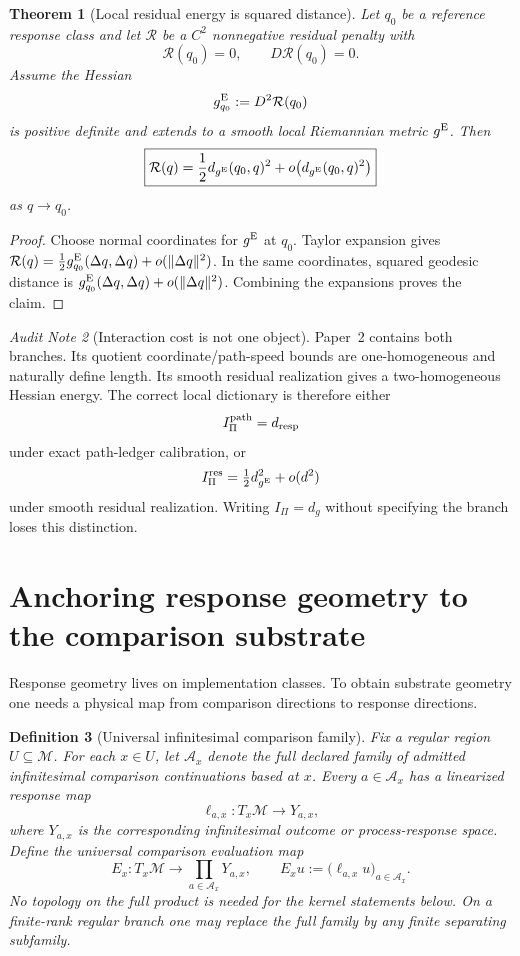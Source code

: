 \documentclass[11pt]{article}
\newtheorem{theorem}{Theorem}[section]
\newtheorem{definition}[theorem]{Definition}
\theoremstyle{remark}
\newtheorem{audit}[theorem]{Audit Note}
\newcommand{\Mgeom}{\mathcal M}
\newcommand{\dresp}{d_{\rm resp}}
\begin{document}
\begin{theorem}[Local residual energy is squared distance]
\label{thm:residual-energy-distance}
Let $q_0$ be a reference response class and let $\mathcal R$ be a $C^2$ nonnegative residual penalty with
\[
        \mathcal R(q_0)=0,
        \qquad
        D\mathcal R(q_0)=0.
\]
Assume the Hessian
\[
        g^{\rm E}_{q_0}:=D^2\mathcal R(q_0)
\]
is positive definite and extends to a smooth local Riemannian metric $g^{\rm E}$.  Then
\[
        \boxed{
        \mathcal R(q)
        =\frac12 d_{g^{\rm E}}(q_0,q)^2
        +o\!\left(d_{g^{\rm E}}(q_0,q)^2\right)
        }
\]
as $q\to q_0$.
\end{theorem}

\begin{proof}
Choose normal coordinates for $g^{\rm E}$ at $q_0$.  Taylor expansion gives $\mathcal R(q)=\tfrac12 g^{\rm E}_{q_0}(\Delta q,\Delta q)+o(\|\Delta q\|^2)$.  In the same coordinates, squared geodesic distance is $g^{\rm E}_{q_0}(\Delta q,\Delta q)+o(\|\Delta q\|^2)$.  Combining the expansions proves the claim.
\end{proof}

\begin{audit}[Interaction cost is not one object]
Paper~2 contains both branches.  Its quotient coordinate/path-speed bounds are one-homogeneous and naturally define length.  Its smooth residual realization gives a two-homogeneous Hessian energy.  The correct local dictionary is therefore either
\[
        I_\Pi^{\rm path}=\dresp
\]
under exact path-ledger calibration, or
\[
        I_\Pi^{\rm res}=\tfrac12 d_{g^{\rm E}}^2+o(d^2)
\]
under smooth residual realization.  Writing $I_\Pi=d_g$ without specifying the branch loses this distinction.
\end{audit}

\section{Anchoring response geometry to the comparison substrate}
\label{sec:response-anchor}

Response geometry lives on implementation classes.  To obtain substrate geometry one needs a physical map from comparison directions to response directions.

\begin{definition}[Universal infinitesimal comparison family]
Fix a regular region $U\subseteq\Mgeom$.  For each $x\in U$, let
$\mathcal A_x$ denote the full declared family of admitted infinitesimal comparison
continuations based at $x$.  Every $a\in\mathcal A_x$ has a linearized response map
\[
        \ell_{a,x}:T_x\Mgeom\longrightarrow Y_{a,x},
\]
where $Y_{a,x}$ is the corresponding infinitesimal outcome or process-response
space.  Define the universal comparison evaluation map
\[
        E_x:T_x\Mgeom\longrightarrow
        \prod_{a\in\mathcal A_x}Y_{a,x},
        \qquad
        E_xu:=\bigl(\ell_{a,x}u\bigr)_{a\in\mathcal A_x}.
\]
No topology on the full product is needed for the kernel statements below.
On a finite-rank regular branch one may replace the full family by any finite
separating subfamily.
\end{definition}
\end{document}

